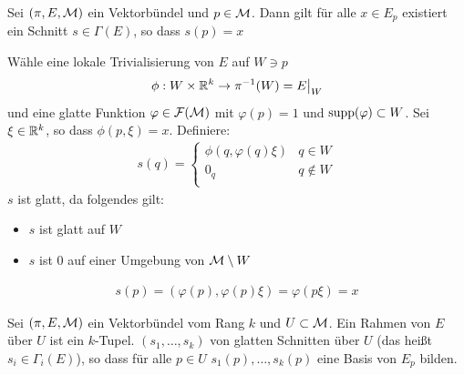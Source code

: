 \begin{lem}
Sei $(\pi, E, \mathcal{M})$ ein Vektorbündel und $p \in \mathcal{M}$.
Dann gilt für alle $x \in E_p$ existiert ein Schnitt $s \in \Gamma (E)$, so dass $s(p)=x$
\end{lem}
\begin{bew}
Wähle eine lokale Trivialisierung von $E$ auf $W \ni p$
\begin{align}
\phi: W \times \mathbb{R}^k \to \pi^{-1}(W) = E\big\vert_W
\end{align}
und eine glatte Funktion $\varphi \in \mathcal{F}(\mathcal{M})$ mit $\varphi(p)=1$ und $\operatorname{supp}(\varphi) \subset W$.
Sei $\xi \in \mathbb{R}^k$, so dass $\phi (p, \xi)=x$.
Definiere:
\begin{align}
s(q) = \left\{
\begin{array}{ll}
\phi(q, \varphi(q)\xi) & q\in W \\
0_q & q \not\in W \\
\end{array}
\right.
\end{align}
$s$ ist glatt, da folgendes gilt:
\begin{itemize}
\item $s$ ist glatt auf $W$
\item $s$ ist $0$ auf einer Umgebung von $\mathcal{M} \setminus W$
\end{itemize}
\begin{align}
s(p) = ( \varphi(p), \varphi(p) \xi ) = \varphi (p \xi) = x
\end{align}
\end{bew}

\begin{defs}
Sei $(\pi, E, \mathcal{M})$ ein Vektorbündel vom Rang $k$ und $U \subset \mathcal{M}$.
Ein Rahmen von $E$ über $U$ ist ein $k$-Tupel.
$(s_1, \dots, s_k)$ von glatten Schnitten über $U$ (das heißt $s_i \in \Gamma_i (E)$), so dass für alle $p \in U$
$s_1 (p), \dots, s_k (p)$ eine Basis von $E_p$ bilden.
\end{defs}